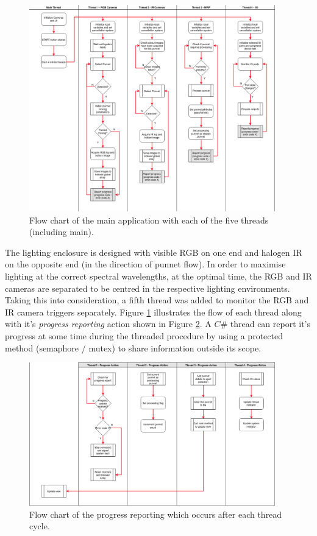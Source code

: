 \documentclass[fleqn,twoside,12pt]{report}
\begin{document}
\begin{figure}[ht]
	\centering
	\includegraphics[width=0.95\textwidth]{software_flow_1.png}
	\caption{Flow chart of the main application with each of the five threads (including main).}
	\label{fig:software_flow_1}
\end{figure} 


The lighting enclosure is designed with visible RGB on one end and halogen IR on the opposite end (in the direction of punnet flow). In order to maximise lighting at the correct spectral wavelengths, at the optimal time, the RGB and IR cameras are separated to be centred in the respective lighting environments. Taking this into consideration, a fifth thread was added to monitor the RGB and IR camera triggers separately. Figure \ref{fig:software_flow_1} illustrates the flow of each thread along with it's \textit{progress reporting} action shown in Figure \ref{fig:software_flow_2}. A $C\#$ thread can report it's progress at some time during the threaded procedure by using a protected method (semaphore / mutex) to share information outside its scope. 

\begin{figure}[ht]
	\centering
	\includegraphics[width=0.95\textwidth]{software_flow_2.png}
	\caption{Flow chart of the progress reporting which occurs after each thread cycle.}
	\label{fig:software_flow_2}
\end{figure} 
\end{document}
